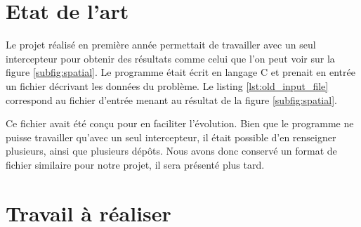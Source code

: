     \section{Etat de l'art}
    	Le projet réalisé en première année permettait de travailler avec un seul intercepteur pour obtenir des résultats comme celui que l'on peut voir sur la figure \ref{subfig:spatial}. Le programme était écrit en langage C et prenait en entrée un fichier décrivant les données du problème. Le listing \ref{lst:old_input_file} correspond au fichier d'entrée menant au résultat de la figure \ref{subfig:spatial}.

    	Ce fichier avait été conçu pour en faciliter l'évolution. Bien que le programme ne puisse travailler qu'avec un seul intercepteur, il était possible d'en renseigner plusieurs, ainsi que plusieurs dépôts. Nous avons donc conservé un format de fichier similaire pour notre projet, il sera présenté plus tard.

    	\begin{code}
    		\label{lst:old_input_file}
    	\end{code}
    \section{Travail à réaliser}